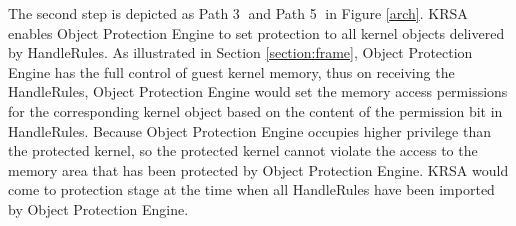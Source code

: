 \documentclass[conference]{IEEEtran}
\begin{document}
The second step is depicted as Path \textcircled{3} and Path \textcircled{5} in Figure \ref{arch}. KRSA enables Object Protection Engine to set protection to all kernel objects delivered by HandleRules. As illustrated in Section \ref{section:frame}, Object Protection Engine has the full control of guest kernel memory, thus
on receiving the HandleRules, Object Protection Engine would set the memory access permissions for the corresponding kernel object based on the content of the permission bit in HandleRules.
Because Object Protection Engine occupies higher privilege than the protected kernel, so the protected kernel cannot violate the access to the memory area that has been protected by Object Protection Engine. KRSA would come to protection stage at the time when all HandleRules have been imported by Object Protection Engine. 
\end{document}
